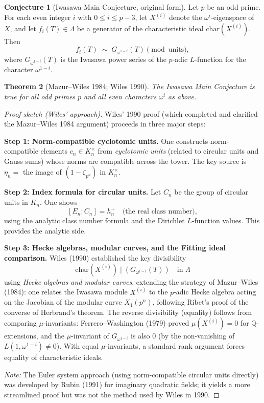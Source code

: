 \documentclass[12pt,a4paper]{amsart}
\newtheorem{theorem}{Theorem}[section]
\theoremstyle{definition}
\newtheorem{conjecture}[theorem]{Conjecture}
\newcommand{\Q}{\mathbb{Q}}
\begin{document}
\begin{conjecture}[Iwasawa Main Conjecture, original form]
\label{conj:main}
Let $p$ be an odd prime.  For each even integer $i$ with $0 \le i \le p-3$,
let $X^{(i)}$ denote the $\omega^i$-eigenspace of $X$, and let
$f_i(T) \in \Lambda$ be a generator of the characteristic ideal
$\mathrm{char}(X^{(i)})$.  Then
\[
  f_i(T) \;\sim\; G_{\omega^{1-i}}(T) \pmod{\mathrm{units}},
\]
where $G_{\omega^{1-i}}(T)$ is the Iwasawa power series of the $p$-adic
$L$-function for the character $\omega^{1-i}$.
\end{conjecture}

\begin{theorem}[Mazur--Wiles 1984; Wiles 1990]
\label{thm:mazur_wiles}
The Iwasawa Main Conjecture is true for all odd primes $p$ and all
even characters $\omega^i$ as above.
\end{theorem}

\begin{proof}[Proof sketch (Wiles' approach)]
Wiles' 1990 proof (which completed and clarified the Mazur--Wiles 1984
argument) proceeds in three major steps:

\textbf{Step 1: Norm-compatible cyclotomic units.}
One constructs norm-compatible elements $c_n \in K_n^\times$ from
\emph{cyclotomic units} (related to circular units and Gauss sums)
whose norms are compatible across the tower.
The key source is $\eta_n = $ the image of $(1 - \zeta_{p^n})$ in $K_n^\times$.

\textbf{Step 2: Index formula for circular units.}
Let $C_n$ be the group of circular units in $K_n$.  One shows
\[
  [E_n : C_n] = h_n^+ \quad\text{(the real class number)},
\]
using the analytic class number formula and the Dirichlet $L$-function values.
This provides the analytic side.

\textbf{Step 3: Hecke algebras, modular curves, and the Fitting ideal comparison.}
Wiles (1990) established the key divisibility
\[
  \mathrm{char}(X^{(i)}) \mid (G_{\omega^{1-i}}(T)) \quad \text{in } \Lambda
\]
using \emph{Hecke algebras and modular curves}, extending the strategy of
Mazur--Wiles (1984): one relates the Iwasawa module $X^{(i)}$ to the
$p$-adic Hecke algebra acting on the Jacobian of the modular curve $X_1(p^n)$,
following Ribet's proof of the converse of Herbrand's theorem.
The reverse divisibility (equality) follows from comparing $\mu$-invariants:
Ferrero--Washington (1979) proved $\mu(X^{(i)}) = 0$ for $\Q$-extensions,
and the $\mu$-invariant of $G_{\omega^{1-i}}$ is also $0$ (by the non-vanishing
of $L(1, \omega^{1-i}) \ne 0$).  With equal $\mu$-invariants, a standard
rank argument forces equality of characteristic ideals.

\textit{Note:} The Euler system approach (using norm-compatible circular units
directly) was developed by Rubin (1991) for imaginary quadratic fields; it
yields a more streamlined proof but was not the method used by Wiles in 1990.
\end{proof}
\end{document}

